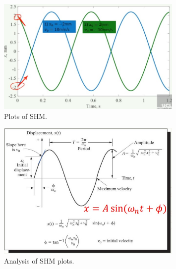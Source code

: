 \begin{figure}[H]
    \centering
    \includegraphics[width = 0.8\textwidth]{./img/diagram12.jpg}
    \caption{Plots of SHM.}
\end{figure}
\begin{figure}[H]
    \centering
    \includegraphics[width = 0.8\textwidth]{./img/diagram13.jpg}
    \caption{Analysis of SHM plots.}
\end{figure}
